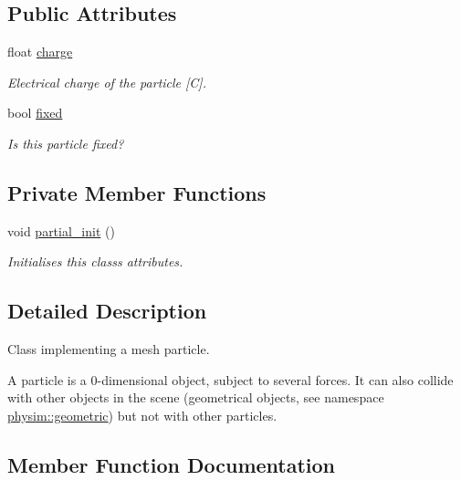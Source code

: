 \subsection*{Public Attributes}
\begin{DoxyCompactItemize}
\item 
\mbox{\label{classphysim_1_1particles_1_1mesh__particle_adf14d64e9effa2bcf5cb84a537bd8027}} 
float \hyperlink{classphysim_1_1particles_1_1mesh__particle_adf14d64e9effa2bcf5cb84a537bd8027}{charge}
\begin{DoxyCompactList}\small\item\em Electrical charge of the particle \mbox{[}C\mbox{]}. \end{DoxyCompactList}\item 
bool \hyperlink{classphysim_1_1particles_1_1mesh__particle_a5813a57507d8a3539a1534dfd1b74883}{fixed}
\begin{DoxyCompactList}\small\item\em Is this particle fixed? \end{DoxyCompactList}\end{DoxyCompactItemize}
\subsection*{Private Member Functions}
\begin{DoxyCompactItemize}
\item 
void \hyperlink{classphysim_1_1particles_1_1mesh__particle_acf394e0f807a6105e579750afbadeaea}{partial\+\_\+init} ()
\begin{DoxyCompactList}\small\item\em Initialises this class\textquotesingle{}s attributes. \end{DoxyCompactList}\end{DoxyCompactItemize}


\subsection{Detailed Description}
Class implementing a mesh particle. 

A particle is a 0-\/dimensional object, subject to several forces. It can also collide with other objects in the scene (geometrical objects, see namespace \hyperlink{namespacephysim_1_1geometric}{physim\+::geometric}) but not with other particles. 

\subsection{Member Function Documentation}
\mbox{\label{classphysim_1_1particles_1_1mesh__particle_a1b3c3eac1e62296c2facd8c9d9b84608}} 
